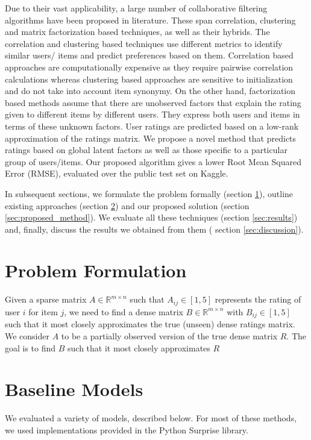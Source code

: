 \documentclass[10pt,conference,compsocconf]{IEEEtran}
\begin{document}
Due to their vast applicability, a large number of collaborative filtering  algorithms have been proposed in literature. These span correlation, clustering and matrix factorization based techniques, as well as their hybrids. The correlation and clustering based techniques use different metrics to identify similar users/ items and predict preferences based on them. Correlation based approaches are computationally expensive as they require pairwise correlation calculations whereas clustering based approaches are sensitive to initialization and do not take into account item synonymy. On the other hand, factorization based methods assume that there are unobserved factors that explain the rating given to different items by different users. They express both users and items in terms of these unknown factors. User ratings are predicted based on a low-rank approximation of the ratings matrix. We propose a novel method that predicts ratings based on global latent factors as well as those specific to a particular group of users/items. Our proposed algorithm gives a lower Root Mean Squared Error (RMSE), evaluated over the public test set on Kaggle.

In subsequent sections, we formulate the problem formally (section \ref{sec:problem}), outline existing approaches (section \ref{sec:existing_approaches})  and our proposed solution (section \ref{sec:proposed_method}). We evaluate all these techniques (section \ref{sec:results}) and, finally, discuss the results we obtained from them ( section \ref{sec:discussion}).

\section{Problem Formulation}\label{sec:problem}
Given a sparse matrix $A \in \mathbb{R} ^{m \times n}$ such that $A_{ij} \in [1,5] $ represents the rating of user $i$ for item $j$, we need to find a dense matrix  $B \in \mathbb{R} ^{m \times n}$ with $B_{ij} \in [1,5] $ such that it most closely approximates the true (unseen) dense ratings matrix. We consider $A$ to be a partially observed version of the true dense matrix $R$. The goal is to find $B$ such that it most closely approximates $R$

\section{Baseline Models}\label{sec:existing_approaches}
We evaluated a variety of models, described below. For most of these methods, we used implementations provided in the Python Surprise \cite{Surprise} library.
\end{document}
